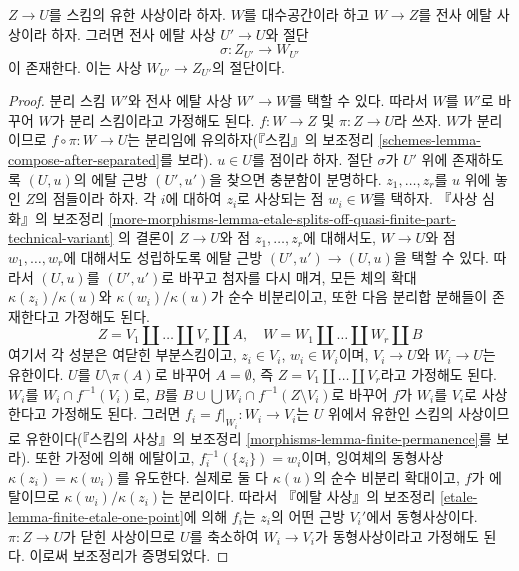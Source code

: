 \begin{lemma}
\label{lemma-surjection-space-of-sections}
$Z \to U$를 스킴의 유한 사상이라 하자. $W$를 대수공간이라 하고
$W \to Z$를 전사 에탈 사상이라 하자. 그러면 전사 에탈 사상
$U' \to U$와 절단
$$
\sigma : Z_{U'} \to W_{U'}
$$
이 존재한다. 이는 사상 $W_{U'} \to Z_{U'}$의 절단이다.
\end{lemma}

\begin{proof}
분리 스킴 $W'$와 전사 에탈 사상 $W' \to W$를 택할 수 있다.
따라서 $W$를 $W'$로 바꾸어 $W$가 분리 스킴이라고 가정해도 된다.
$f : W \to Z$ 및 $\pi : Z \to U$라 쓰자. $W$가 분리이므로
$f \circ \pi : W \to U$는 분리임에 유의하자(『스킴』의 보조정리
\ref{schemes-lemma-compose-after-separated}를 보라).
$u \in U$를 점이라 하자. 절단 $\sigma$가 $U'$ 위에 존재하도록
$(U, u)$의 에탈 근방 $(U', u')$을 찾으면 충분함이 분명하다.
$z_1, \ldots, z_r$를 $u$ 위에 놓인 $Z$의 점들이라 하자.
각 $i$에 대하여 $z_i$로 사상되는 점 $w_i \in W$를 택하자.
『사상 심화』의 보조정리
\ref{more-morphisms-lemma-etale-splits-off-quasi-finite-part-technical-variant}
의 결론이 $Z \to U$와 점 $z_1, \ldots, z_r$에 대해서도,
$W \to U$와 점 $w_1, \ldots, w_r$에 대해서도 성립하도록 에탈 근방
$(U', u') \to (U, u)$을 택할 수 있다. 따라서 $(U, u)$를
$(U', u')$로 바꾸고 첨자를 다시 매겨, 모든 체의 확대
$\kappa(z_i)/\kappa(u)$와 $\kappa(w_i)/\kappa(u)$가 순수 비분리이고,
또한 다음 분리합 분해들이 존재한다고 가정해도 된다.
$$
Z = V_1 \amalg \ldots \amalg V_r \amalg A, \quad
W = W_1 \amalg \ldots \amalg W_r \amalg B
$$
여기서 각 성분은 여닫힌 부분스킴이고, $z_i \in V_i$, $w_i \in W_i$이며,
$V_i \to U$와 $W_i \to U$는 유한이다.
$U$를 $U \setminus \pi(A)$로 바꾸어 $A = \emptyset$, 즉
$Z = V_1 \amalg \ldots \amalg V_r$라고 가정해도 된다.
$W_i$를 $W_i \cap f^{-1}(V_i)$로, $B$를
$B \cup \bigcup W_i \cap f^{-1}(Z \setminus V_i)$로 바꾸어
$f$가 $W_i$를 $V_i$로 사상한다고 가정해도 된다.
그러면 $f_i = f|_{W_i} : W_i \to V_i$는 $U$ 위에서 유한인
스킴의 사상이므로 유한이다(『스킴의 사상』의 보조정리
\ref{morphisms-lemma-finite-permanence}를 보라).
또한 가정에 의해 에탈이고, $f_i^{-1}(\{z_i\}) = w_i$이며,
잉여체의 동형사상 $\kappa(z_i) = \kappa(w_i)$를 유도한다.
실제로 둘 다 $\kappa(u)$의 순수 비분리 확대이고, $f$가 에탈이므로
$\kappa(w_i)/\kappa(z_i)$는 분리이다. 따라서 『에탈 사상』의 보조정리
\ref{etale-lemma-finite-etale-one-point}에 의해 $f_i$는 $z_i$의
어떤 근방 $V_i'$에서 동형사상이다. $\pi : Z \to U$가 닫힌 사상이므로
$U$를 축소하여 $W_i \to V_i$가 동형사상이라고 가정해도 된다.
이로써 보조정리가 증명되었다.
\end{proof}

